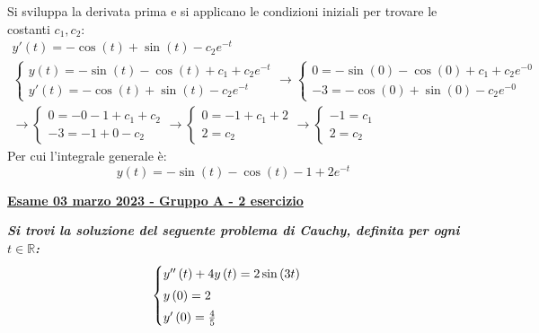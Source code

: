 \documentclass[a4paper]{article}
\newcommand{\definition}[1]{\textcolor{Red3}{\textbf{#1}}}
\newcommand{\example}[1]{\textcolor{Green4}{\textbf{#1}}}
\begin{document}
	Si sviluppa la derivata prima e si applicano le condizioni iniziali per trovare le costanti $c_{1},c_{2}$:
	\begin{gather*}
		y'\left(t\right) = -\cos\left(t\right) + \sin\left(t\right) - c_{2}e^{-t} \\
		\begin{cases}
			y\left(t\right) = -\sin\left(t\right) - \cos\left(t\right) + c_{1} + c_{2}e^{-t} \\
			y'\left(t\right) = -\cos\left(t\right) + \sin\left(t\right) - c_{2}e^{-t}
		\end{cases}
		\rightarrow
		\begin{cases}
			0 = -\sin\left(0\right) - \cos\left(0\right) + c_{1} + c_{2}e^{-0} \\
			-3 = -\cos\left(0\right) + \sin\left(0\right) - c_{2}e^{-0}
		\end{cases} \\
		\rightarrow
		\begin{cases}
			0 = -0 -1 + c_{1} + c_{2} \\
			-3 = -1 + 0 - c_{2}
		\end{cases}
		\rightarrow
		\begin{cases}
			0 = -1 + c_{1} + 2 \\
			2 = c_{2}
		\end{cases}
		\rightarrow
		\begin{cases}
			-1 = c_{1} \\
			2 = c_{2}
		\end{cases}
	\end{gather*}
	Per cui l'integrale generale è:
	\begin{equation*}
		y\left(t\right) = -\sin\left(t\right) - \cos\left(t\right) -1 + 2e^{-t}
	\end{equation*}\newpage

	\begin{flushleft}
		\label{exam: esame 03 marzo 2023 - Gruppo A - 2 esercizio}
		\hypertarget{
			exam: esame 03 marzo 2023 - Gruppo A - 2 esercizio
		}{
			\definition{\underline{Esame 03 marzo 2023 - Gruppo A - 2 esercizio}}
		}
	\end{flushleft}
	\example{\emph{Si trovi la soluzione del seguente problema di Cauchy, definita per ogni $t \in \mathbb{R}$:}
	\begin{equation*}
		\begin{cases}
			y''\left(t\right) + 4y\left(t\right) = 2\sin\left(3t\right) \vspace{.3em}\\
			y\left(0\right) = 2 \vspace{.3em}\\
			y'\left(0\right) = \frac{4}{5}
		\end{cases}
	\end{equation*}}
\end{document}
